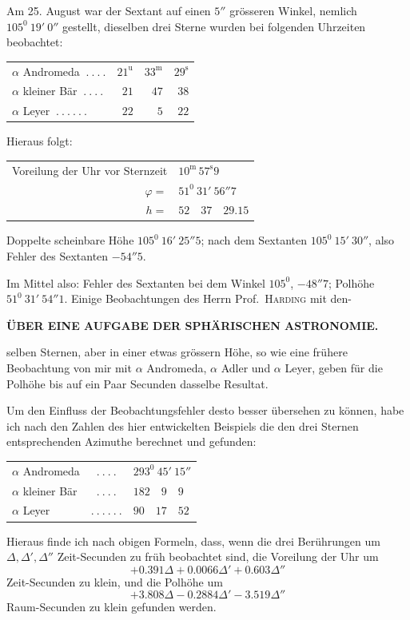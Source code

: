 Am 25. August war der Sextant auf einen $5''$ grösseren Winkel, nemlich
$105^0\ 19'\ 0''$ gestellt, dieselben drei Sterne wurden bei folgenden Uhrzeiten beobachtet:
\begin{center}
\begin{tabular}{lrrr}
$\alpha$ Andromeda $\ .\ .\ .\ .$&$21^{\mathrm u}$&$33^{\mathrm m}$&$29^{\mathrm s}$\\
$\alpha$ kleiner Bär $\ .\ .\ .\ .$&$21$&$47$&$38$\\
$\alpha$ Leyer $\ .\ .\ .\ .\ .\ .$&$22$&$5$&$22$
\end{tabular}
\end{center}
\par\indent Hieraus folgt:
\begin{center}
\begin{tabular}{@{}r@{\enspace}l@{}}
Voreilung der Uhr vor Sternzeit&$10^{\mathrm m}\,57^{\mathrm s}9$\\
$\varphi=$&$51^0\ 31'\ 56''7$\\
$h=$&$52\quad37\quad29.15$
\end{tabular}
\end{center}
\noindent Doppelte scheinbare Höhe $105^0\ 16'\ 25''5$; nach dem Sextanten $105^0\ 15'\ 30''$,
also Fehler des Sextanten $-54''5$.

Im Mittel also: Fehler des Sextanten bei dem Winkel $105^0$, $-48''7$;
Polhöhe $51^0\ 31'\ 54''1$. Einige Beobachtungen des Herrn Prof.\ \textsc{Harding} mit den-
\par\clearpage
\thispagestyle{empty}
\noindent{}%
\makebox[12mm][l]{}%
\parbox[t]{\dimexpr\linewidth-24mm\relax}{\centering\fontsize{8.5}{10}\selectfont\bfseries ÜBER EINE AUFGABE DER SPHÄRISCHEN ASTRONOMIE.\par}%
\par\nobreak\medskip
\noindent selben Sternen, aber in einer etwas grössern Höhe, so wie eine frühere Beobachtung von mir mit $\alpha$ Andromeda, $\alpha$ Adler und $\alpha$ Leyer, geben für die Polhöhe bis auf ein Paar Secunden dasselbe Resultat.

Um den Einfluss der Beobachtungsfehler desto besser übersehen zu können, habe ich nach den Zahlen des hier entwickelten Beispiels die den drei Sternen entsprechenden Azimuthe berechnet und gefunden:
\begin{center}
\begin{tabular}{lcl}
$\alpha$ Andromeda & $.\ .\ .\ .$ & $293^{0}\ 45'\ 15''$\\
$\alpha$ kleiner Bär & $.\ .\ .\ .$ & $182\quad9\quad9$\\
$\alpha$ Leyer & $.\ .\ .\ .\ .\ .$ & $90\quad17\quad52$
\end{tabular}
\end{center}
\par\indent Hieraus finde ich nach obigen Formeln, dass, wenn die drei Berührungen um $\Delta,\Delta',\Delta''$ Zeit-Secunden zu früh beobachtet sind, die Voreilung der Uhr um
\[
+0.391\Delta+0.0066\Delta'+0.603\Delta''
\]
Zeit-Secunden zu klein, und die Polhöhe um
\[
+3.808\Delta-0.2884\Delta'-3.519\Delta''
\]
Raum-Secunden zu klein gefunden werden.

